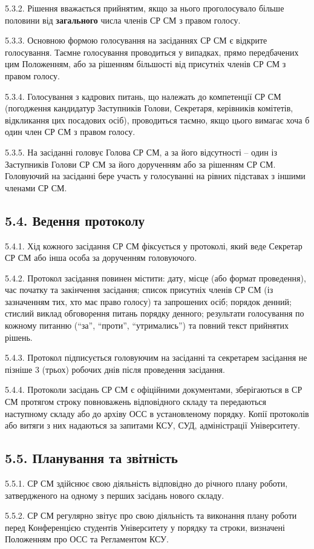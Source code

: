     5.3.2. Рішення вважається прийнятим, якщо за нього проголосувало більше половини від \textbf{загального} числа членів СР СМ з правом голосу.

    5.3.3. Основною формою голосування на засіданнях СР СМ є відкрите голосування. Таємне голосування проводиться у випадках, прямо передбачених цим Положенням, або за рішенням більшості від присутніх членів СР СМ з правом голосу.

    5.3.4. Голосування з кадрових питань, що належать до компетенції СР СМ (погодження кандидатур Заступників Голови, Секретаря, керівників комітетів, відкликання цих посадових осіб), проводиться таємно, якщо цього вимагає хоча б один член СР СМ з правом голосу.

    5.3.5. На засіданні головує Голова СР СМ, а за його відсутності – один із Заступників Голови СР СМ за його дорученням або за рішенням СР СМ. Головуючий на засіданні бере участь у голосуванні на рівних підставах з іншими членами СР СМ.

\subsection*{5.4. Ведення протоколу}
    5.4.1. Хід кожного засідання СР СМ фіксується у протоколі, який веде Секретар СР СМ або інша особа за дорученням головуючого.

    5.4.2. Протокол засідання повинен містити: дату, місце (або формат проведення), час початку та закінчення засідання; список присутніх членів СР СМ (із зазначенням тих, хто має право голосу) та запрошених осіб; порядок денний; стислий виклад обговорення питань порядку денного; результати голосування по кожному питанню (``за'', ``проти'', ``утримались'') та повний текст прийнятих рішень.

    5.4.3. Протокол підписується головуючим на засіданні та секретарем засідання не пізніше 3 (трьох) робочих днів після проведення засідання.

    5.4.4. Протоколи засідань СР СМ є офіційними документами, зберігаються в СР СМ протягом строку повноважень відповідного складу та передаються наступному складу або до архіву ОСС в установленому порядку. Копії протоколів або витяги з них надаються за запитами КСУ, СУД, адміністрації Університету.

\subsection*{5.5. Планування та звітність}
    5.5.1. СР СМ здійснює свою діяльність відповідно до річного плану роботи, затвердженого на одному з перших засідань нового складу.

    5.5.2. СР СМ регулярно звітує про свою діяльність та виконання плану роботи перед Конференцією студентів Університету у порядку та строки, визначені Положенням про ОСС та Регламентом КСУ.
